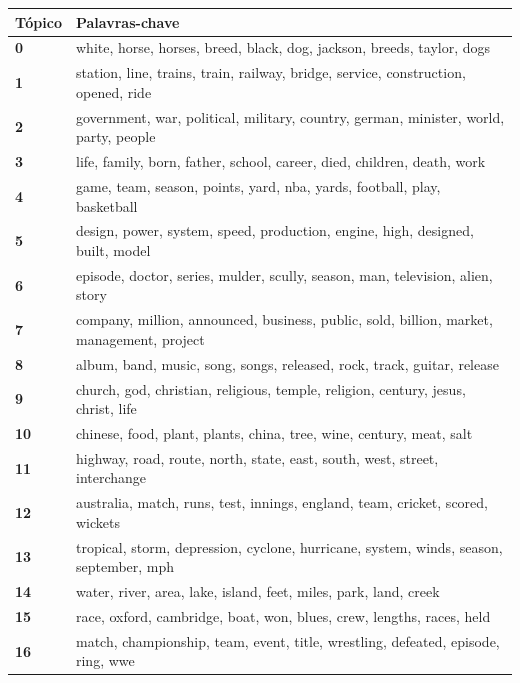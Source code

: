 \begin{table}[htpb]
    \centering
    \scriptsize
    \begin{tabularx}{\textwidth}{@{}l X@{}}
        \toprule
        \textbf{Tópico} & \textbf{Palavras-chave} \\
        \midrule
        \textbf{0} & white, horse, horses, breed, black, dog, jackson, breeds, taylor, dogs \\
        \textbf{1} & station, line, trains, train, railway, bridge, service, construction, opened, ride \\
        \textbf{2} & government, war, political, military, country, german, minister, world, party, people \\
        \textbf{3} & life, family, born, father, school, career, died, children, death, work \\
        \textbf{4} & game, team, season, points, yard, nba, yards, football, play, basketball \\
        \textbf{5} & design, power, system, speed, production, engine, high, designed, built, model \\
        \textbf{6} & episode, doctor, series, mulder, scully, season, man, television, alien, story \\
        \textbf{7} & company, million, announced, business, public, sold, billion, market, management, project \\
        \textbf{8} & album, band, music, song, songs, released, rock, track, guitar, release \\
        \textbf{9} & church, god, christian, religious, temple, religion, century, jesus, christ, life \\
        \textbf{10} & chinese, food, plant, plants, china, tree, wine, century, meat, salt \\
        \textbf{11} & highway, road, route, north, state, east, south, west, street, interchange \\
        \textbf{12} & australia, match, runs, test, innings, england, team, cricket, scored, wickets \\
        \textbf{13} & tropical, storm, depression, cyclone, hurricane, system, winds, season, september, mph \\
        \textbf{14} & water, river, area, lake, island, feet, miles, park, land, creek \\
        \textbf{15} & race, oxford, cambridge, boat, won, blues, crew, lengths, races, held \\
        \textbf{16} & match, championship, team, event, title, wrestling, defeated, episode, ring, wwe \\

\end{tabularx}
\end{table}
